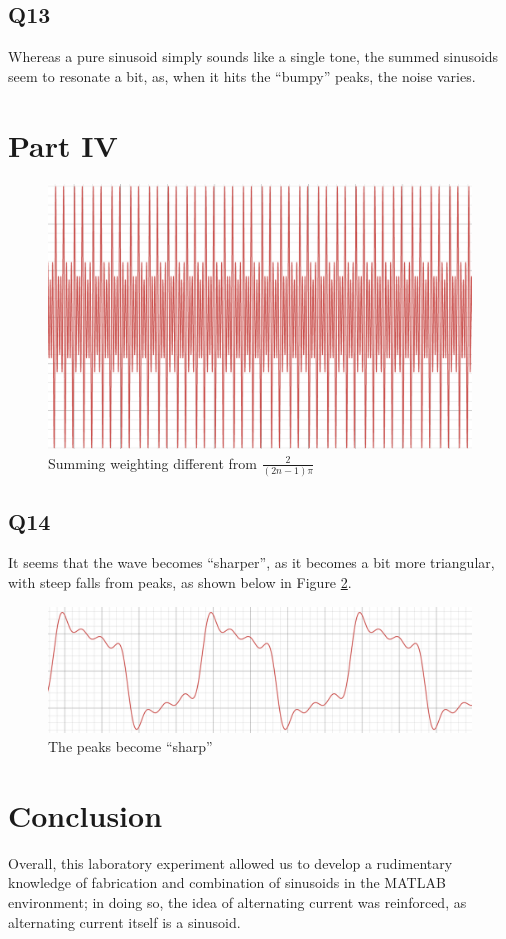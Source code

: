 \documentclass[
	letterpaper, %
	10pt, %
]{CSUniSchoolLabReport}
\begin{document}
\subsection{Q13} Whereas a pure sinusoid simply sounds like a single tone, the summed sinusoids seem to resonate a bit, as, when it hits the ``bumpy'' peaks, the noise varies.

\section{Part IV}

\begin{figure}[H]
  \centering
  \includegraphics[width=.9\textwidth]{Figures/L7P41.png}
  \caption{Summing weighting different from $\frac{2}{(2n-1)\pi}$}
  \label{fig:6}
\end{figure}

\subsection{Q14} It seems that the wave becomes ``sharper'', as it becomes a bit more triangular, with steep falls from peaks, as shown below in Figure \ref{fig:7}.

\begin{figure}[H]
  \centering
  \includegraphics[width=.9\textwidth]{Figures/L7P42.png}
  \caption{The peaks become ``sharp''}
  \label{fig:7}
\end{figure}

\section{Conclusion}

Overall, this laboratory experiment allowed us to develop a rudimentary knowledge of fabrication and combination of sinusoids in the MATLAB environment; in doing so, the idea of alternating current was reinforced, as alternating current itself is a sinusoid.
\end{document}
